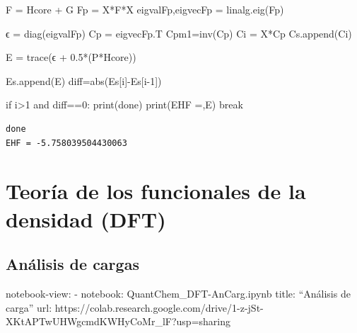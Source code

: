 \documentclass[
  letterpaper,
  DIV=11,
  numbers=noendperiod]{scrreprt}
\newenvironment{Shaded}{\begin{snugshade}}{\end{snugshade}}
\newcommand{\BuiltInTok}[1]{\textcolor[rgb]{0.00,0.23,0.31}{#1}}
\newcommand{\ControlFlowTok}[1]{\textcolor[rgb]{0.00,0.23,0.31}{#1}}
\newcommand{\DecValTok}[1]{\textcolor[rgb]{0.68,0.00,0.00}{#1}}
\newcommand{\FloatTok}[1]{\textcolor[rgb]{0.68,0.00,0.00}{#1}}
\newcommand{\KeywordTok}[1]{\textcolor[rgb]{0.00,0.23,0.31}{#1}}
\newcommand{\NormalTok}[1]{\textcolor[rgb]{0.00,0.23,0.31}{#1}}
\newcommand{\OperatorTok}[1]{\textcolor[rgb]{0.37,0.37,0.37}{#1}}
\newcommand{\StringTok}[1]{\textcolor[rgb]{0.13,0.47,0.30}{#1}}
\begin{document}
\begin{Shaded}
\begin{Highlighting}[]
\NormalTok{    F }\OperatorTok{=}\NormalTok{ Hcore }\OperatorTok{+}\NormalTok{ G}
\NormalTok{    Fp }\OperatorTok{=}\NormalTok{ X}\OperatorTok{*}\NormalTok{F}\OperatorTok{*}\NormalTok{X}
\NormalTok{    eigvalFp,eigvecFp }\OperatorTok{=}\NormalTok{ linalg.eig(Fp)}
    
\NormalTok{    ϵ }\OperatorTok{=}\NormalTok{ diag(eigvalFp)}
\NormalTok{    Cp }\OperatorTok{=}\NormalTok{ eigvecFp.T}
\NormalTok{    Cpm1}\OperatorTok{=}\NormalTok{inv(Cp)}
\NormalTok{    Ci }\OperatorTok{=}\NormalTok{ X}\OperatorTok{*}\NormalTok{Cp}
\NormalTok{    Cs.append(Ci)}

\NormalTok{    E }\OperatorTok{=}\NormalTok{ trace(ϵ }\OperatorTok{+} \FloatTok{0.5}\OperatorTok{*}\NormalTok{(P}\OperatorTok{*}\NormalTok{Hcore))}

\NormalTok{    Es.append(E)}
\NormalTok{    diff}\OperatorTok{=}\BuiltInTok{abs}\NormalTok{(Es[i]}\OperatorTok{{-}}\NormalTok{Es[i}\OperatorTok{{-}}\DecValTok{1}\NormalTok{])}
    
    \ControlFlowTok{if}\NormalTok{ i}\OperatorTok{\textgreater{}}\DecValTok{1} \KeywordTok{and}\NormalTok{ diff}\OperatorTok{==}\DecValTok{0}\NormalTok{:}
        \BuiltInTok{print}\NormalTok{(}\StringTok{\textquotesingle{}done\textquotesingle{}}\NormalTok{)}
        \BuiltInTok{print}\NormalTok{(}\StringTok{\textquotesingle{}EHF =\textquotesingle{}}\NormalTok{,E)}
        \ControlFlowTok{break}
\end{Highlighting}
\end{Shaded}

\begin{verbatim}
done
EHF = -5.758039504430063
\end{verbatim}


\hypertarget{teoruxeda-de-los-funcionales-de-la-densidad-dft}{%
\chapter{Teoría de los funcionales de la densidad
(DFT)}\label{teoruxeda-de-los-funcionales-de-la-densidad-dft}}

\hypertarget{anuxe1lisis-de-cargas}{%
\section{Análisis de cargas}\label{anuxe1lisis-de-cargas}}

notebook-view: - notebook: QuantChem\_DFT-AnCarg.ipynb title: ``Análisis
de carga'' url:
https://colab.research.google.com/drive/1-z-jSt-XKtAPTwUHWgcmdKWHyCoMr\_lF?usp=sharing
\end{document}
